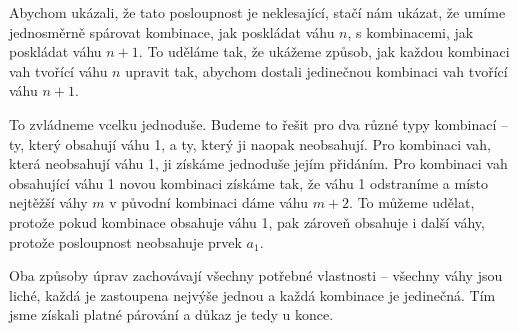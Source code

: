 \documentclass{fkssolpub}
\author{Ondřej Sedláček}
\begin{document}
 

Abychom ukázali, že tato posloupnost je neklesající, stačí nám
ukázat, že umíme jednosměrně spárovat kombinace, jak poskládat váhu
$n$, s kombinacemi, jak poskládat váhu $n + 1$. To uděláme tak,
že ukážeme způsob, jak každou kombinaci vah tvořící váhu $n$
upravit tak, abychom dostali jedinečnou kombinaci vah tvořící váhu
$n + 1$.

To zvládneme vcelku jednoduše. Budeme to řešit pro dva různé typy
kombinací -- ty, který obsahují váhu 1, a ty, který ji naopak neobsahují.
Pro kombinaci vah, která neobsahují váhu 1, ji získáme jednoduše
jejím přidáním. Pro kombinaci vah obsahující váhu 1 novou kombinaci
získáme tak, že váhu 1 odstraníme a místo nejtěžší váhy $m$ v původní
kombinaci dáme váhu $m + 2$. To můžeme udělat, protože pokud kombinace
obsahuje váhu 1, pak zároveň obsahuje i další váhy, protože posloupnost
neobsahuje prvek $a_1$.

Oba způsoby úprav zachovávají všechny potřebné vlastnosti -- všechny
váhy jsou liché, každá je zastoupena nejvýše jednou a každá kombinace
je jedinečná. Tím jsme získali platné párování a důkaz je tedy u konce.
\end{document}
